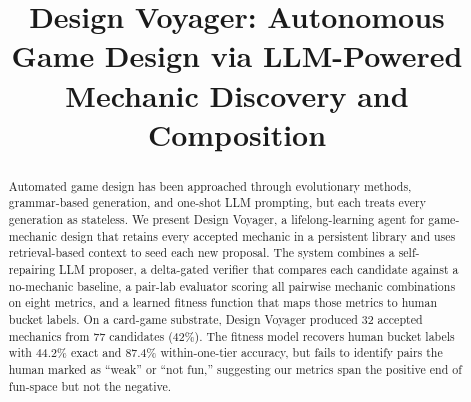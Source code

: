 \documentclass[conference]{IEEEtran}
\begin{document}
\title{Design Voyager: Autonomous Game Design via
LLM-Powered Mechanic Discovery and Composition}

\author{
\and
{}
\and
{}
\and
{}
\and
{}
}

\maketitle

\begin{abstract}
Automated game design has been approached through evolutionary methods,     
  grammar-based generation, and one-shot LLM prompting, but each treats every   
  generation as stateless. We present Design Voyager, a lifelong-learning agent
  for game-mechanic design that retains every accepted mechanic in a persistent
  library and uses retrieval-based context to seed each new proposal. The system
   combines a self-repairing LLM proposer, a delta-gated verifier that compares
  each candidate against a no-mechanic baseline, a pair-lab evaluator scoring   
  all pairwise mechanic combinations on eight metrics, and a learned fitness  
  function that maps those metrics to human bucket labels. On a card-game       
  substrate, Design Voyager produced 32 accepted mechanics from 77 candidates   
  (42\%). The fitness model recovers human bucket labels with 44.2\% exact and  
  87.4\% within-one-tier accuracy, but fails to identify pairs the human marked 
  as ``weak'' or ``not fun,'' suggesting our metrics span the positive end of 
  fun-space but not the negative.
\end{abstract}
\end{document}
